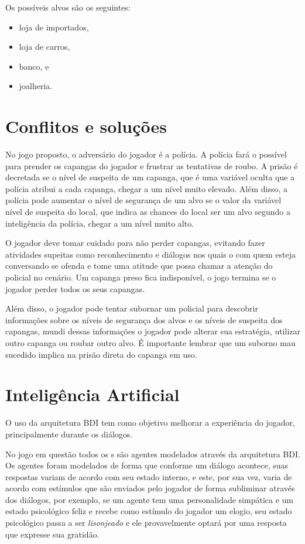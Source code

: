 Os possíveis alvos são os seguintes:
\begin{itemize}
\item loja de importados,
\item loja de carros,
\item banco, e
\item joalheria.
\end{itemize}


\section{Conflitos e soluções}
No jogo proposto, o adversário do jogador é a polícia. A polícia fará o possível para prender os capangas do jogador e frustrar as tentativas de roubo. A prisão é decretada se o nível de suspeita de um capanga, que é uma variável oculta que a polícia atribui a cada capanga, chegar a um nível muito elevado. Além disso, a polícia pode aumentar o nível de segurança de um alvo se  o valor da variável nível de suspeita do local, que indica as chances do local ser um alvo segundo a inteligência da polícia, chegar a um nível muito alto.

O jogador deve tomar cuidado para não perder capangas, evitando fazer atividades supeitas como reconhecimento e diálogos nos quais o \npc{} com quem esteja conversando se ofenda e tome uma atitude que possa chamar a atenção do policial no cenário.
Um capanga preso fica indisponível, o jogo termina se o jogador perder todos os seus capangas.

Além disso, o jogador pode tentar subornar um policial para descobrir informações sobre os níveis de segurança dos alvos e os níveis de suspeita dos capangas, mundi dessas informações o jogador pode alterar sua estratégia, utilizar outro capanga ou roubar outro alvo. É importante lembrar que um suborno mau sucedido implica na prisão direta do capanga em uso.

\section{Inteligência Artificial}
O uso da arquitetura BDI tem como objetivo melhorar a experiência do jogador, principalmente durante os diálogos.

No jogo em questão todos os \npc{}s são agentes modelados através da arquitetura BDI. Os agentes foram modelados de forma que conforme um diálogo acontece, suas respostas variam de acordo com seu estado interno, e este, por sua vez, varia de acordo com estímulos que são enviados pelo jogador de forma subliminar através dos diálogos, por exemplo, se um agente tem uma personalidade simpática e um estado psicológico feliz e recebe como estímulo do jogador um elogio, seu estado psicológico passa a ser \emph{lisonjeado} e ele provavelmente optará por uma resposta que expresse sua gratidão.

